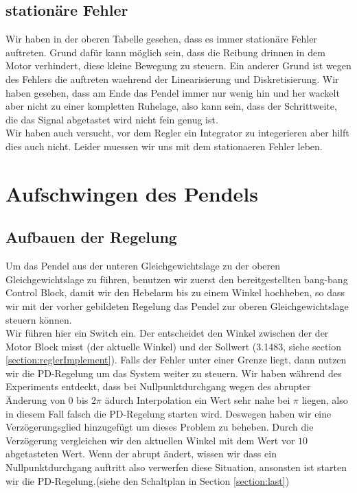 \documentclass{article}
\newcommand{\gera}{\"{a}}
\newcommand{\gero}{\"{o}}
\newcommand{\geru}{\"{u}}
\begin{document}
\subsection{station\gera re Fehler}
Wir haben in der oberen Tabelle gesehen, dass es immer station\gera re Fehler auftreten. Grund daf\geru r kann m\gero glich sein, dass die Reibung drinnen in dem Motor verhindert, diese kleine Bewegung zu steuern. Ein anderer Grund ist wegen des Fehlers die auftreten waehrend der Linearisierung und Diskretisierung. Wir haben gesehen, dass am Ende das Pendel immer nur wenig hin und her wackelt aber nicht zu einer kompletten Ruhelage, also kann sein, dass der Schrittweite, die das Signal abgetastet wird nicht fein genug ist. \\
Wir haben auch versucht, vor dem Regler ein Integrator zu integerieren aber hilft dies auch nicht. Leider muessen wir uns mit dem stationaeren Fehler leben.

\section{Aufschwingen des Pendels}
\subsection{Aufbauen der Regelung}
Um das Pendel aus der unteren Gleichgewichtslage zu der oberen Gleichgewichtslage zu führen,
benutzen wir zuerst den bereitgestellten bang-bang Control Block, damit wir den Hebelarm bis zu
einem Winkel hochheben, so dass wir mit der vorher gebildeten Regelung das Pendel zur oberen Gleichgewichtslage
steuern können. \\
Wir führen hier ein Switch ein. Der entscheidet den Winkel zwischen der der Motor Block misst (der aktuelle Winkel) und
der Sollwert (3.1483, siehe section \ref{section:reglerImplement}). Falls der Fehler unter einer Grenze liegt, dann nutzen wir die PD-Regelung
um das System weiter zu steuern.  Wir haben w\gera hrend des Experiments entdeckt, dass bei Nullpunktdurchgang wegen des abrupter \"{A}nderung von $0$ bis $2 \pi$ \gera durch Interpolation ein Wert sehr nahe bei $\pi$ liegen, also in diesem Fall falsch die PD-Regelung starten wird. Deswegen haben wir eine Verz\gero gerungsglied hinzugef\geru gt um dieses Problem zu beheben. Durch die Verz\gero gerung vergleichen wir den aktuellen Winkel mit dem Wert vor $10$ abgetasteten Wert. Wenn der abrupt \gera ndert, wissen wir dass ein Nullpunktdurchgang auftritt also verwerfen diese Situation, ansonsten ist starten wir die PD-Regelung.(siehe den Schaltplan in Section \ref{section:last})
%
%
\end{document}
